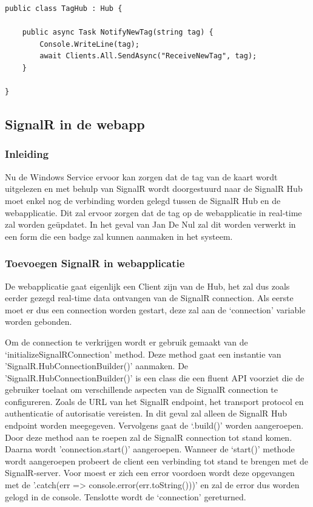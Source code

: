 \begin{verbatim} 
public class TagHub : Hub {
    
    public async Task NotifyNewTag(string tag) {
        Console.WriteLine(tag);
        await Clients.All.SendAsync("ReceiveNewTag", tag);
    }

}
\end{verbatim}

\subsection{SignalR in de webapp}

\subsubsection{Inleiding}
Nu de Windows Service ervoor kan zorgen dat de tag van de kaart wordt uitgelezen en met behulp van SignalR wordt doorgestuurd naar de SignalR Hub moet enkel nog de verbinding worden gelegd tussen de SignalR Hub en de webapplicatie. Dit zal ervoor zorgen dat de tag op de webapplicatie in real-time zal worden geüpdatet. In het geval van Jan De Nul zal dit worden verwerkt in een form die een badge zal kunnen aanmaken in het systeem. 

\subsubsection{Toevoegen SignalR in webapplicatie}
De webapplicatie gaat eigenlijk een Client zijn van de Hub, het zal dus zoals eerder gezegd real-time data ontvangen van de SignalR connection. Als eerste moet er dus een connection worden gestart, deze zal aan de ‘connection’ variable worden gebonden.  

Om de connection te verkrijgen wordt er gebruik gemaakt van de ‘initializeSignalRConnection’ method. Deze method gaat een instantie van 'SignalR.HubConnectionBuilder()’ aanmaken. De 'SignalR.HubConnectionBuilder()’ is een class die een fluent API voorziet die de gebruiker toelaat om verschillende aspecten van de SignalR connection te configureren. Zoals de URL van het SignalR endpoint, het transport protocol en authenticatie of autorisatie vereisten. In dit geval zal alleen de SignalR Hub endpoint worden meegegeven. Vervolgens gaat de ‘.build()’ worden aangeroepen. Door deze method aan te roepen zal de SignalR connection tot stand komen. Daarna wordt 'connection.start()’ aangeroepen. Wanneer de ‘start()’ methode wordt aangeroepen probeert de client een verbinding tot stand te brengen met de SignalR-server. Voor moest er zich een error voordoen wordt deze opgevangen met de '.catch(err => console.error(err.toString()))' en zal de error dus worden gelogd in de console. Tenslotte wordt de ‘connection’ gereturned. 

